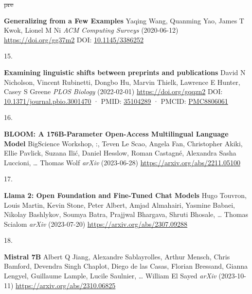 \documentclass[
]{article}
\newlength{\cslhangindent}
\newlength{\csllabelwidth}
\newlength{\cslentryspacingunit} %
\newenvironment{CSLReferences}[2] %
 {%
  \setlength{\parindent}{0pt}
  \ifodd #1
  \let\oldpar\par
  \def\par{\hangindent=\cslhangindent\oldpar}
  \fi
  \setlength{\parskip}{#2\cslentryspacingunit}
 }%
 {}
\newcommand{\CSLBlock}[1]{#1\hfill\break}
\newcommand{\CSLLeftMargin}[1]{\parbox[t]{\csllabelwidth}{#1}}
\newcommand{\CSLRightInline}[1]{\parbox[t]{\linewidth - \csllabelwidth}{#1}\break}
\providecommand{\DIFdeltex}[1]{{\protect\color{red}\sout{#1}}}                      %
\providecommand{\DIFaddbegin}{} %
\providecommand{\DIFaddend}{} %
\providecommand{\DIFdelbegin}{} %
\providecommand{\DIFdelend}{} %
\providecommand{\DIFdel}[1]{\texorpdfstring{\DIFdeltex{#1}}{}} %
\newcommand{\DIFscaledelfig}{0.5}
\newlength{\DIFdelgraphicswidth} %
\newlength{\DIFdelgraphicsheight} %
\newcommand{\DIFaddincludegraphics}[2][]{{\color{blue}\fbox{\DIFOincludegraphics[#1]{#2}}}} %
\newcommand{\DIFdelincludegraphics}[2][]{%
\sbox{\DIFdelgraphicsbox}{\DIFOincludegraphics[#1]{#2}}%
\settoboxwidth{\DIFdelgraphicswidth}{\DIFdelgraphicsbox} %
\settoboxtotalheight{\DIFdelgraphicsheight}{\DIFdelgraphicsbox} %
\scalebox{\DIFscaledelfig}{%
\parbox[b]{\DIFdelgraphicswidth}{\usebox{\DIFdelgraphicsbox}\\[-\baselineskip] \rule{\DIFdelgraphicswidth}{0em}}\llap{\resizebox{\DIFdelgraphicswidth}{\DIFdelgraphicsheight}{%
\setlength{\unitlength}{\DIFdelgraphicswidth}%
\begin{picture}(1,1)%
\thicklines\linethickness{2pt} %
{\color[rgb]{1,0,0}\put(0,0){\framebox(1,1){}}}%
{\color[rgb]{1,0,0}\put(0,0){\line( 1,1){1}}}%
{\color[rgb]{1,0,0}\put(0,1){\line(1,-1){1}}}%
\end{picture}%
}\hspace*{3pt}}} %
} %
\DeclareRobustCommand{\DIFaddbegin}{\DIFOaddbegin \let\includegraphics\DIFaddincludegraphics} %
\DeclareRobustCommand{\DIFaddend}{\DIFOaddend \let\includegraphics\DIFOincludegraphics} %
\DeclareRobustCommand{\DIFdelbegin}{\DIFOdelbegin \let\includegraphics\DIFdelincludegraphics} %
\DeclareRobustCommand{\DIFdelend}{\DIFOaddend \let\includegraphics\DIFOincludegraphics} %
\begin{document}
\begin{CSLReferences}{0}{0}
\DIFdel{pre}%
\DIFdelend \CSLRightInline{\textbf{Generalizing from a Few Examples}
\CSLBlock{Yaqing Wang, Quanming Yao, James T Kwok, Lionel M Ni} \emph{ACM Computing Surveys} (2020-06-12) \url{https://doi.org/gg37m2}
\CSLBlock{DOI: \href{https://doi.org/10.1145/3386252}{10.1145/3386252}}}

\leavevmode{}%
\DIFdelbegin %
\DIFdelend \DIFaddbegin \CSLLeftMargin{15. }\DIFaddend %
\CSLRightInline{\textbf{Examining linguistic shifts between preprints and publications}
\CSLBlock{David N Nicholson, Vincent Rubinetti, Dongbo Hu, Marvin Thielk, Lawrence E Hunter, Casey S Greene} \emph{PLOS Biology} (2022-02-01) \url{https://doi.org/gqqzn2}
\CSLBlock{DOI: \href{https://doi.org/10.1371/journal.pbio.3001470}{10.1371/journal.pbio.3001470} · PMID: \href{https://www.ncbi.nlm.nih.gov/pubmed/35104289}{35104289} · PMCID: \href{https://www.ncbi.nlm.nih.gov/pmc/articles/PMC8806061}{PMC8806061}}}

\leavevmode{}%
\DIFdelbegin %
\DIFdelend \DIFaddbegin \CSLLeftMargin{16. }\DIFaddend %
\CSLRightInline{\textbf{BLOOM: A 176B-Parameter Open-Access Multilingual Language Model}
\CSLBlock{BigScience Workshop, :, Teven Le Scao, Angela Fan, Christopher Akiki, Ellie Pavlick, Suzana Ilić, Daniel Hesslow, Roman Castagné, Alexandra Sasha Luccioni, \ldots{} Thomas Wolf} \emph{arXiv} (2023-06-28) \url{https://arxiv.org/abs/2211.05100}}

\leavevmode{}%
\DIFdelbegin %
\DIFdelend \DIFaddbegin \CSLLeftMargin{17. }\DIFaddend %
\CSLRightInline{\textbf{Llama 2: Open Foundation and Fine-Tuned Chat Models}
\CSLBlock{Hugo Touvron, Louis Martin, Kevin Stone, Peter Albert, Amjad Almahairi, Yasmine Babaei, Nikolay Bashlykov, Soumya Batra, Prajjwal Bhargava, Shruti Bhosale, \ldots{} Thomas Scialom} \emph{arXiv} (2023-07-20) \url{https://arxiv.org/abs/2307.09288}}

\leavevmode{}%
\DIFdelbegin %
\DIFdelend \DIFaddbegin \CSLLeftMargin{18. }\DIFaddend %
\CSLRightInline{\textbf{Mistral 7B}
\CSLBlock{Albert Q Jiang, Alexandre Sablayrolles, Arthur Mensch, Chris Bamford, Devendra Singh Chaplot, Diego de las Casas, Florian Bressand, Gianna Lengyel, Guillaume Lample, Lucile Saulnier, \ldots{} William El Sayed} \emph{arXiv} (2023-10-11) \url{https://arxiv.org/abs/2310.06825}}


\end{CSLReferences}
\end{document}
